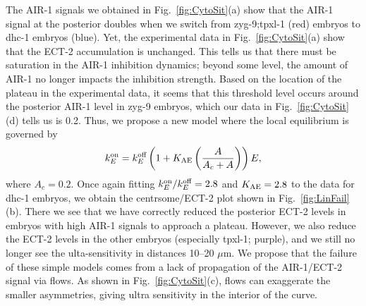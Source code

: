\documentclass[11pt]{article}
\begin{document}
\begin{appendix}
The AIR-1 signals we obtained in Fig.\ \ref{fig:CytoSit}(a) show that the AIR-1 signal at the posterior doubles when we switch from zyg-9;tpxl-1 (red) embryos to dhc-1 embryos (blue). Yet, the experimental data in Fig.\ \ref{fig:CytoSit}(a) show that the ECT-2 accumulation is unchanged. This tells us that there must be saturation in the AIR-1 inhibition dynamics; beyond some level, the amount of AIR-1 no longer impacts the inhibition strength. Based on the location of the plateau in the experimental data, it seems that this threshold level occurs around the posterior AIR-1 level in zyg-9 embryos, which our data in Fig.\ \ref{fig:CytoSit}(d) tells us is 0.2. Thus, we propose a new model where the local equilibrium is governed by 
\begin{equation}
\label{eq:EctASat}
 k^\text{on}_E = k^\text{off}_E \left(1+K_\text{AE} \left(\frac{A}{A_c+A}\right) \right)E,
\end{equation}
where $A_c=0.2$. Once again fitting $k^\text{on}_E/k^\text{off}_E=2.8$ and $K_\text{AE}=2.8$ to the data for dhc-1 embryos, we obtain the centrsome/ECT-2 plot shown in Fig.\ \ref{fig:LinFail}(b). There we see that we have correctly reduced the posterior ECT-2 levels in embryos with high AIR-1 signals to approach a plateau. However, we also reduce the ECT-2 levels in the other embryos (especially tpxl-1; purple), and we still no longer see the ulta-sensitivity in distances 10--20 $\mu$m. We propose that the failure of these simple models comes from a lack of propagation of the AIR-1/ECT-2 signal via flows. As shown in Fig.\ \ref{fig:CytoSit}(c), flows can exaggerate the smaller asymmetries, giving ultra sensitivity in the interior of the curve.


\end{appendix}




\end{document}
